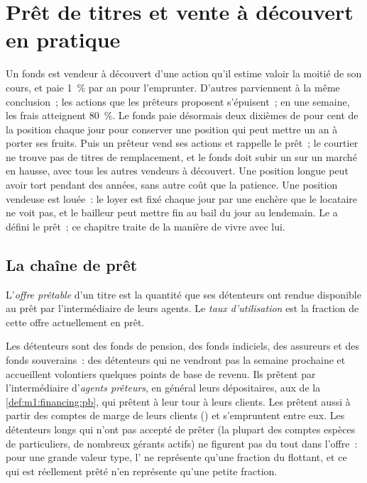 \chapter{Prêt de titres et vente à découvert en pratique}\label{ch:m1:stock-loan-and-short-selling}

Un fonds est vendeur à découvert d'une action qu'il estime valoir la moitié de son cours, et paie 1~\% par
an pour l'emprunter. D'autres parviennent à la même conclusion~; les actions que les prêteurs proposent
s'épuisent~; en une semaine, les frais atteignent 80~\%. Le fonds paie désormais deux dixièmes de
pour cent de la position chaque jour pour conserver une position qui peut mettre un an à
porter ses fruits. Puis un prêteur vend ses actions et rappelle le prêt~; le courtier ne
trouve pas de titres de remplacement, et le fonds doit subir un  sur un marché en hausse, avec
tous les autres vendeurs à découvert. Une position longue peut avoir tort pendant des années, sans autre coût que la patience.
Une position vendeuse est louée~: le loyer est fixé chaque jour par une enchère que le locataire
ne voit pas, et le bailleur peut mettre fin au bail du jour au lendemain. Le 
a défini le prêt~; ce chapitre traite de la manière de vivre avec lui.

\section{La chaîne de prêt}

\begin{definition}\label{def:m1:stock-loan-and-short-selling:utilisation}
L'\emph{offre prêtable} d'un titre est la
quantité que ses détenteurs ont rendue disponible au prêt par l'intermédiaire de leurs agents.
Le \emph{taux d'utilisation} est la fraction de cette offre
actuellement en prêt.
\end{definition}

Les détenteurs sont des fonds de pension, des fonds indiciels, des assureurs et des fonds souverains~:
des détenteurs qui ne vendront pas la semaine prochaine et accueillent volontiers quelques points de base
de revenu. Ils prêtent par l'intermédiaire d'\emph{agents prêteurs}, en général leurs dépositaires, aux
 de la \cref{def:m1:financing:pb}, qui prêtent à leur tour à leurs
clients. Les  prêtent aussi à partir des comptes de marge de leurs clients
() et s'empruntent entre eux. Les détenteurs longs qui n'ont pas
accepté de prêter (la plupart des comptes espèces de particuliers, de nombreux gérants actifs) ne figurent
pas du tout dans l'offre~: pour une grande valeur type, l' ne représente qu'une
fraction du flottant, et ce qui est réellement prêté n'en représente qu'une petite
fraction.

